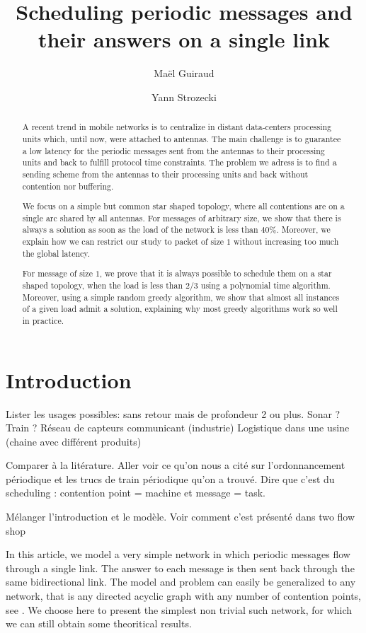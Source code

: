 \documentclass[10pt, conference, letterpaper]{IEEEtran}
\title{Scheduling periodic messages and their answers on a single link}
\author[1,2]{Ma\"el Guiraud}
\author[1]{Yann Strozecki}
\affil[1]{David Laboratory, UVSQ}
\affil[2]{Nokia Bell Labs France}
\begin{document}
\maketitle

\begin{abstract}

A recent trend in mobile networks is to centralize in distant data-centers processing units which, until now, were attached to antennas. The main challenge is to guarantee a low latency for the periodic messages sent from the antennas to their processing units and back  to fulfill protocol time constraints. The problem we adress is to find a sending scheme from the antennas to their processing units and back without contention nor buffering.

We focus on a simple but common star shaped topology, where all contentions are on a single arc shared by all antennas. For messages of arbitrary size, we show that there is always a solution as soon as the load of the network is less than $40\%$. Moreover, we explain how we can restrict our study to packet of size $1$ without increasing too much the global latency. 

For message of size $1$, we prove that it is always possible to schedule them on a star shaped topology, when the load is less than $2/3$ using a polynomial time algorithm.
Moreover, using a simple random greedy algorithm, we show that almost all
instances of a given load admit a solution, explaining why most greedy algorithms work so well in practice.  
\end{abstract}


\section{Introduction}

Lister les usages possibles: 
sans retour mais de profondeur 2 ou plus. Sonar ? Train ?
Réseau de capteurs communicant (industrie)
Logistique dans une usine (chaine avec différent produits)

Comparer à la litérature. Aller voir ce qu'on nous a cité sur l'ordonnancement périodique 
et les trucs de train périodique qu'on a trouvé.
Dire que c'est du scheduling : contention point = machine et message = task.


Mélanger l'introduction et le modèle. Voir comment c'est présenté dans two flow shop

In this article, we model a very simple network in which periodic messages flow through a single link. The answer to each message is then sent back through the same bidirectional link. The model and problem can easily be generalized to any network, that is any directed acyclic graph with any number of contention points, see \cite{dominique2018deterministic}. We choose here to present the simplest non trivial such network, for which we can still obtain some theoritical results. 
\end{document}
